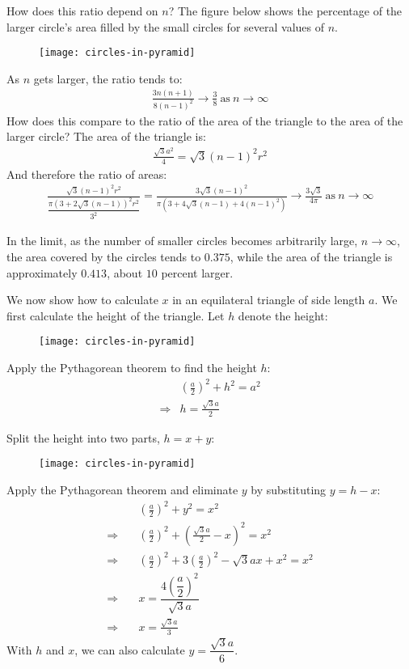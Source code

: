 How does this ratio depend on $n$? The figure below shows the percentage of the larger circle's area filled by the small circles for several values of $n$. 
\begin{figure}[H]
\centering
\texttt{[image: circles-in-pyramid]}
\end{figure}
As $n$ gets larger, the ratio tends to:
\begin{align*}
\frac{3n(n+1)}{8(n-1)^2} \rightarrow \frac{3}{8}
~\text{as}~n\rightarrow\infty
\end{align*}
How does this compare to the ratio of the area of the triangle to the area of the larger circle? The area of the triangle is:
\begin{align*}
\frac{\sqrt{3}a^2}{4}
  = \sqrt{3}(n-1)^2r^2
\end{align*}
And therefore the ratio of areas:
\begin{align*}
\frac{\sqrt{3}(n-1)^2r^2}{\dfrac{\pi\left(3+2\sqrt{3}(n-1)\right)^2r^2}{3^2}}
= \frac{3\sqrt{3}(n-1)^2}{\pi\left(3+4\sqrt{3}(n-1)+4(n-1)^2\right)}
\rightarrow \frac{3\sqrt{3}}{4\pi}~\text{as}~n\rightarrow\infty
\end{align*}

In the limit, as the number of smaller circles becomes arbitrarily large, $n\rightarrow\infty$, the area covered by the circles tends to $0.375$, while the area of the triangle is approximately $0.413$, about $10$ percent larger. 

We now show how to calculate $x$ in an equilateral triangle of side length $a$. We first calculate the height of the triangle. Let $h$ denote the height:
\begin{figure}[H]
\centering
\texttt{[image: circles-in-pyramid]}
\end{figure}

Apply the Pythagorean theorem to find the height $h$:
\begin{align*}
& \left(\frac{a}{2}\right)^2 + h^2 = a^2 \\
\Rightarrow 
& h = \frac{\sqrt{3}a}{2}
\end{align*}

Split the height into two parts, $h=x+y$:
\begin{figure}[H]
\centering
\texttt{[image: circles-in-pyramid]}
\end{figure}
Apply the Pythagorean theorem and eliminate $y$ by substituting $y=h-x$:
\begin{align*}
& \left(\frac{a}{2}\right)^2 + y^2 = x^2 \\
\Rightarrow \quad
& \left(\frac{a}{2}\right)^2 + \left(\frac{\sqrt{3}a}{2}-x\right)^2 = x^2 \\
\Rightarrow \quad
& \left(\frac{a}{2}\right)^2 + 3 \left(\frac{a}{2}\right)^2 - \sqrt{3}ax + x^2 = x^2 \\[1em]
\Rightarrow \quad
& x = \dfrac{4\left(\dfrac{a}{2}\right)^2}{\sqrt{3}a} \\[1em]
\Rightarrow \quad
& x = \frac{\sqrt{3}a}{3}
\end{align*}
With $h$ and $x$, we can also calculate $y = \dfrac{\sqrt{3}a}{6}$.
